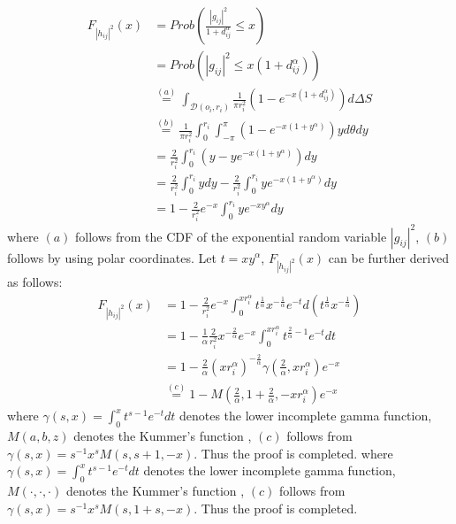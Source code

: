 \documentclass[journal]{IEEEtran}
\begin{document}
\begin{IEEEkeywords}
\begin{align}
F_{\left|h_{ij} \right|^2} \left(x\right) &= Prob\left(\frac{\left|g_{ij}\right|^2}{1 + d_{ij}^{\alpha}} \leq x \right) \nonumber \\
& = Prob \left(\left|g_{ij}\right|^2 \leq x \left(1 + d_{ij}^\alpha\right)\right) \nonumber \\
& \overset{\left(a\right)}{=} \int_{\mathcal{D}(o_i, r_i)} \frac{1}{\pi r_i^2}\left(1 - e^{-x\left(1 + d_{ij}^{\alpha}\right)}\right) d\Delta S \nonumber\\
& \overset{\left(b\right)}{=} \frac{1}{\pi r_i^2} \int_{0}^{r_i} \int_{-\pi}^{\pi}\left(1 - e^{-x\left(1 + y^{\alpha}\right)}\right)y d \theta d y \nonumber \\
& = \frac{2}{r_i^2}\int_{0}^{r_i} \left(y - ye^{-x\left(1 + y^\alpha\right)}\right) dy \nonumber \\
& = \frac{2}{r_i^2}\int_{0}^{r_i}y dy - \frac{2}{r_i^2}\int_{0}^{r_i} y e^{-x \left(1 + y^\alpha\right)}dy \nonumber \\
& = 1 - \frac{2}{r_i^2}e^{-x} \int_{0}^{r_i}y e^{-xy^{\alpha}}dy
\end{align}
where $\left(a\right)$ follows from the CDF of the exponential random variable $\left|g_{ij}\right|^2$, $\left(b\right)$ follows by using polar coordinates. Let $t = xy^{\alpha}$, $F_{\left|h_{ij} \right|^2} \left(x\right)$ can be further derived as follows:
\begin{align}
F_{\left|h_{ij} \right|^2} \left(x\right) &= 1 - \frac{2}{r_i^2}e^{-x} \int_{0}^{x r_i^{\alpha}} t^{\frac{1}{\alpha}} x^{-\frac{1}{\alpha}}e^{-t} d\left(t^{\frac{1}{\alpha}} x^{-\frac{1}{\alpha}}\right) \nonumber \\
& = 1 - \frac{1}{\alpha} \frac{2}{r_i^2} x^{-\frac{2}{\alpha}} e^{-x} \int_{0}^{x r_i^{\alpha}} t^{\frac{2}{\alpha} - 1}e^{-t} dt \nonumber \\
& = 1 - \frac{2}{\alpha} \left(x r_i^{\alpha}\right) ^{-\frac{2}{\alpha}} \gamma\left(\frac{2}{\alpha}, xr_i^{\alpha}\right)e^{-x} \nonumber \\
& \overset{\left(c\right)}{=} 1 - M\left(\frac{2}{\alpha}, 1 + \frac{2}{\alpha}, -xr_i^{\alpha}\right)e^{-x}
\end{align}
where $\gamma\left(s,x\right) = \int_{0}^{x}t^{s-1}e^{-t}dt$ denotes the lower incomplete gamma function, $M\left(a,b,z\right)$ denotes the Kummer's function \cite{MAbramowitz}, $\left(c\right)$ follows from $\gamma\left(s,x\right) = s^{-1} x^s M\left(s,s+1,-x\right)$. Thus the proof is completed. 
where $\gamma\left(s,x\right) = \int_{0}^{x}t^{s-1}e^{-t}dt$ denotes the lower incomplete gamma function, $M\left(\cdot,\cdot,\cdot\right)$ denotes the Kummer's function \cite{MAbramowitz}, $\left(c\right)$ follows from $\gamma\left(s,x\right) = s^{-1} x^s M\left(s,1+s,-x\right)$. Thus the proof is completed. 


\end{IEEEkeywords}
\end{document}
